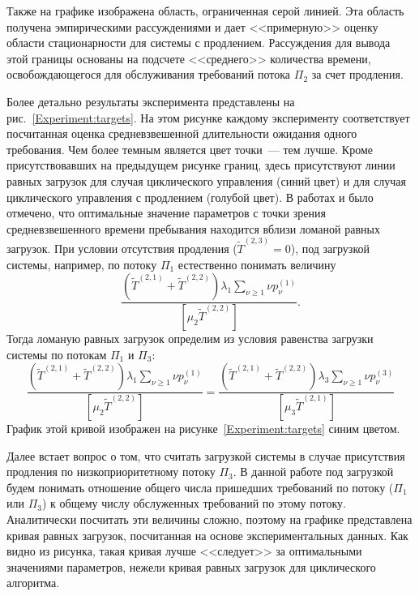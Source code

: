 Также на графике изображена область, ограниченная серой линией. Эта область получена эмпирическими рассуждениями и дает <<примерную>> оценку области стационарности для системы с продлением. Рассуждения для вывода этой границы основаны на подсчете <<среднего>> количества времени, освобождающегося для обслуживания требований потока $\Pi_2$ за счет продления.





Более детально результаты эксперимента представлены на рис.~\ref{Experiment:targets}. На этом рисунке каждому эксперименту соответствует посчитанная оценка средневзвешенной длительности ожидания одного требования. Чем более темным является цвет точки~--- тем лучше. Кроме присутствовавших на предыдущем рисунке границ, здесь присутствуют линии равных загрузок для случая циклического управления (синий цвет) и для случая циклического управления с продлением (голубой цвет). В работах \cite{Fedotkin:2009} и \cite{FedotkinRachinskaya:2016} было отмечено, что оптимальные значение параметров с точки зрения средневзвешенного времени пребывания находится вблизи ломаной равных загрузок. При условии отсутствия продления ($\widetilde T^{(2,3)}=0$),  под загрузкой системы, например, по потоку $\Pi_1$ естественно понимать величину
\begin{equation}
\frac{(\widetilde T^{(2,1)} + \widetilde T^{(2,2)})\lambda_1 \sum_{\nu\geqslant 1}\nu p_{\nu}^{(1)}}{[\mu_2 \widetilde T^{(2,2)}]}.
\end{equation}
Тогда ломаную равных загрузок определим из условия равенства загрузки системы по потокам $\Pi_1$ и $\Pi_3$:
\begin{equation}
\frac{(\widetilde T^{(2,1)} +\widetilde T^{(2,2)})\lambda_1 \sum_{\nu\geqslant 1}\nu p_{\nu}^{(1)}}{[\mu_2 \widetilde T^{(2,2)}]}=
    \frac{(\widetilde T^{(2,1)} + \widetilde T^{(2,2)})\lambda_3 \sum_{\nu\geqslant 1}\nu p_{\nu}^{(3)}}{[\mu_3 \widetilde T^{(2,1)}]}
\end{equation}
График этой кривой изображен на рисунке~\ref{Experiment:targets} синим цветом. 

Далее встает вопрос о том, что считать загрузкой системы в случае присутствия продления по низкоприоритетному потоку $\Pi_3$. В данной работе под загрузкой будем понимать отношение общего числа пришедших требований по потоку ($\Pi_1$ или $\Pi_3$) к общему числу обслуженных требований по этому потоку. Аналитически посчитать эти величины сложно, поэтому на графике представлена кривая равных загрузок, посчитанная на основе экспериментальных данных. Как видно из рисунка, такая кривая лучше <<следует>> за оптимальными значениями параметров, нежели кривая равных загрузок для циклического алгоритма.




